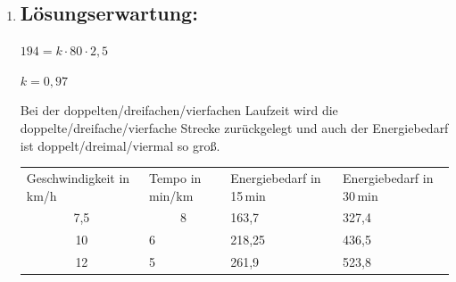 \begin{langesbeispiel}
{\begin{enumerate}
Für die tatsächlich zurückgelegte Weglänge gilt:

$\frac{2}{60}\cdot(f(0)+f(2)+f(4)+f(6)+f(8))\approx 1,388$\,km

$\Rightarrow$ Der Näherungswert für die Weglänge weicht um ca. 118\,m vom exakten Wert ab.

\item \subsection{Lösungserwartung:}
	
$194=k\cdot 80\cdot 2,5$

$k=0,97$\leer

Bei der doppelten/dreifachen/vierfachen Laufzeit wird die doppelte/dreifache/vierfache Strecke zurückgelegt und auch der Energiebedarf ist doppelt/dreimal/viermal so groß.

\begin{center}
	\begin{tabular}{|p{3cm}|p{3cm}|p{3cm}|p{3cm}|}\hline
	\multirow{2}{2cm}{Geschwindigkeit in km/h}&\multirow{2}{2cm}{Tempo in min/km}&\multirow{2}{2cm}{Energiebedarf in 15\,min}&\multirow{2}{2cm}{Energiebedarf in 30\,min}\\
	&&&\\ \hline \hline
	\multicolumn{1}{|c|}{7,5}&\multicolumn{1}{c|}{8}&\cellcolor[gray]{0.7}163,7&\cellcolor[gray]{0.7}327,4\\ \hline
	\multicolumn{1}{|c|}{10}&\cellcolor[gray]{0.7}6&\cellcolor[gray]{0.7}218,25&\cellcolor[gray]{0.7}436,5\\ \hline
	\multicolumn{1}{|c|}{12}&\cellcolor[gray]{0.7}5&\cellcolor[gray]{0.7}261,9&\cellcolor[gray]{0.7}523,8\\ \hline	
	\end{tabular}
\end{center}

\end{enumerate}}
		\end{langesbeispiel}